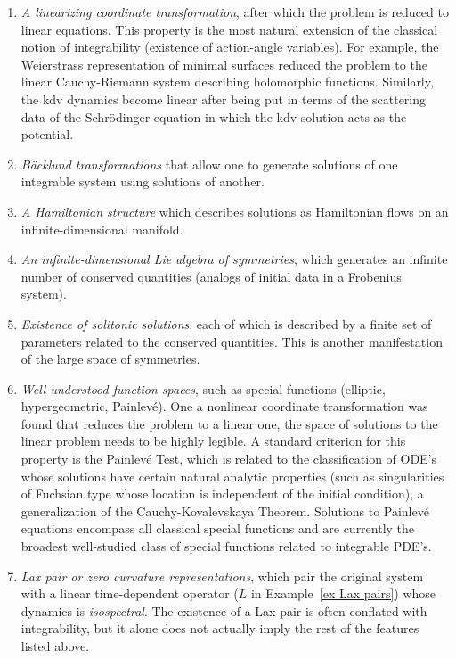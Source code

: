 \begin{enumerate}
    \item \emph{A linearizing coordinate transformation}, after which the problem is reduced to linear equations. This property is the most natural extension of the classical notion of integrability (existence of action-angle variables). For example, the Weierstrass representation of minimal surfaces reduced the problem to the linear Cauchy-Riemann system describing holomorphic functions. Similarly, the \gls{kdv} dynamics become linear after being put in terms of the scattering data of the Schr\"odinger equation in which the \gls{kdv} solution acts as the potential. 
    \item \emph{B\"acklund transformations} that allow one to generate solutions of one integrable system using solutions of another.
    \item \emph{A Hamiltonian structure} which describes solutions as Hamiltonian flows on an infinite-dimensional manifold.
    \item \emph{An infinite-dimensional Lie algebra of symmetries}, which generates an infinite number of conserved quantities (analogs of initial data in a Frobenius system).
    \item \emph{Existence of solitonic solutions}, each of which is described by a finite set of parameters related to the conserved quantities. This is another manifestation of the large space of symmetries.
    \item \emph{Well understood function spaces}, such as special functions (elliptic, hypergeometric, Painlev\'e). One a nonlinear coordinate transformation was found that reduces the problem to a linear one, the space of solutions to the linear problem needs to be highly legible. A standard criterion for this property is the Painlev\'e Test, which is related to the classification of ODE's whose solutions have certain natural analytic properties (such as singularities of Fuchsian type whose location is independent of the initial condition), a generalization of the Cauchy-Kovalevskaya Theorem. Solutions to Painlev\'e equations encompass all classical special functions and are currently the broadest well-studied class of special functions related to integrable PDE's.
    \item \emph{Lax pair or zero curvature representations}, which pair the original system with a linear time-dependent operator ($L$ in Example~\ref{ex Lax pairs}) whose dynamics is \emph{isospectral}. The existence of a Lax pair is often conflated with integrability, but it alone does not actually imply the rest of the features listed above.
\end{enumerate} 

